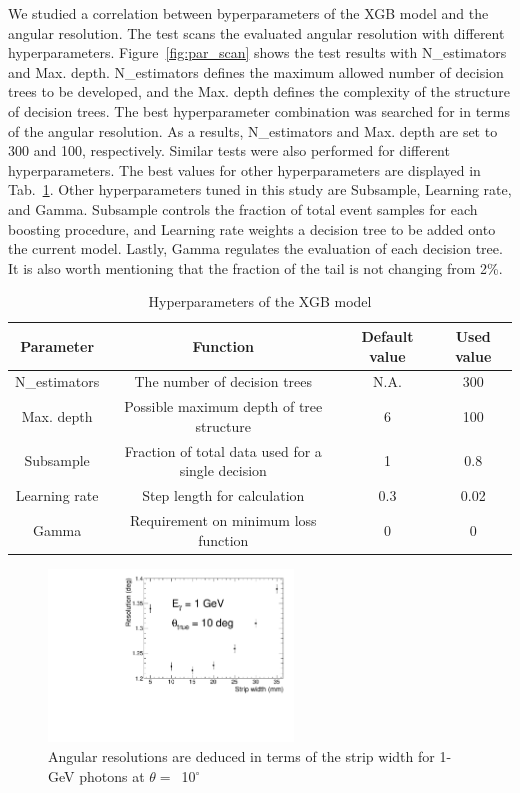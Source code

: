 \documentclass[preprint,12pt,times,a4paper]{elsarticle}
\begin{document}
We studied a correlation between byperparameters of the XGB model and the angular resolution. The test scans the evaluated angular resolution with different hyperparameters. Figure~\ref{fig:par_scan} shows the test results with N\_estimators and Max. depth. N\_estimators defines the maximum allowed number of decision trees to be developed, and the Max. depth defines the complexity of the structure of decision trees. The best hyperparameter combination was searched for in terms of the angular resolution. As a results, N\_estimators and Max. depth are set to 300 and 100, respectively. Similar tests were also performed for different hyperparameters. The best values for other hyperparameters are displayed in Tab.~\ref{tab:XgbPar}. Other hyperparameters tuned in this study are Subsample, Learning rate, and Gamma. Subsample controls the fraction of total event samples for each boosting procedure, and Learning rate weights a decision tree to be added onto the current model. Lastly, Gamma regulates the evaluation of each decision tree. It is also worth mentioning that the fraction of the tail is not changing from 2\%.
\begin{table}[hbt!]{\small
\centering
\caption{Hyperparameters of the XGB model}
\begin{tabular}{cccc}
\hline 
Parameter & Function & Default value & Used value \\ \hline 
N\_estimators & The number of decision trees & N.A. & 300 \\  
Max. depth & Possible maximum depth of tree structure & 6 & 100 \\ 
Subsample & Fraction of total data used for a single decision & 1 & 0.8 \\ 
Learning rate & Step length for calculation & 0.3 & 0.02 \\ 
Gamma & Requirement on minimum loss function & 0 & 0 \\ 
\hline
\end{tabular}
\label{tab:XgbPar}
}\end{table}

\begin{figure}[!hbt]
\centering
\includegraphics[width=0.58\textwidth]{figures/Fig5_width.pdf}
\caption{ Angular resolutions are deduced in terms of the strip width for 1-GeV photons at $\theta=$~10$^{\circ}$ }
\label{fig:angle_reco_width}
\end{figure}
\end{document}
